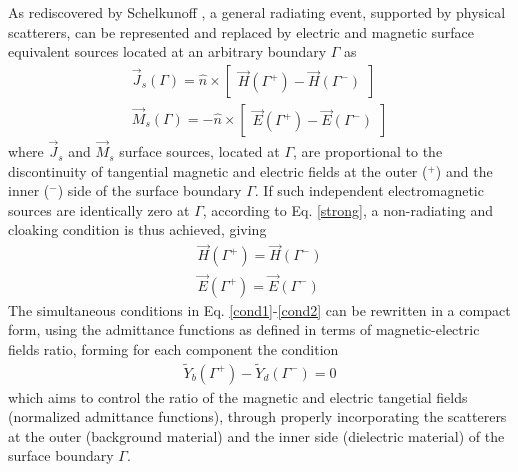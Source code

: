 \documentclass[reprint, showpacs, amsmath,amssymb, aps,
prb]{revtex4-1}
\begin{document}
As rediscovered by Schelkunoff \cite{Schelkunoff_1}, a general radiating event, supported by physical scatterers, can be represented and replaced by electric and magnetic surface equivalent sources located at an arbitrary boundary $\Gamma$ as  
%
\begin{align}
\vec{J}_s(\Gamma)= \hat{n} \times \begin{bmatrix} \vec{H}(\Gamma^+)-\vec{H}(\Gamma^-)\end{bmatrix}\\
\vec{M}_s(\Gamma)= -\hat{n} \times \begin{bmatrix} \vec{E}(\Gamma^+)-\vec{E}(\Gamma^-)\end{bmatrix}
\end{align}
%
where  $\vec{J}_s$ and $\vec{M}_s$ surface sources, located at $\Gamma$, are proportional to the discontinuity of tangential magnetic and electric fields at the outer ($^+$) and the inner ($^-$) side of the surface boundary $\Gamma$. If such independent electromagnetic sources are identically zero at $\Gamma$, according to Eq. \eqref{strong}, a non-radiating and cloaking condition is thus achieved, giving
%
\begin{align}
\label{cond1}
\vec{H}(\Gamma^+)=\vec{H}(\Gamma^-)\\
\vec{E}(\Gamma^+)=\vec{E}(\Gamma^-)
\label{cond2}
\end{align}
%
The simultaneous conditions in Eq. \eqref{cond1}-\eqref{cond2} can be rewritten in a compact form, using the admittance functions as defined in terms of magnetic-electric fields ratio, forming for each component the condition
%
%
\begin{align}
\widetilde{Y}_b(\Gamma^+)-\widetilde{Y}_d(\Gamma^-)=0
\end{align}
%
which aims to control the ratio of the magnetic and electric tangetial fields (normalized admittance functions), through properly incorporating the scatterers at the outer (background material) and the inner side (dielectric material) of the surface boundary $\Gamma$.
\end{document}
